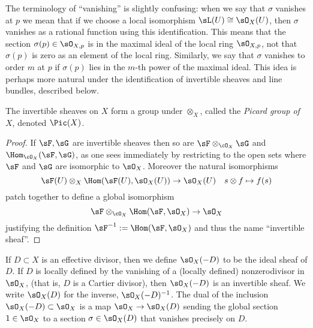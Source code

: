 The terminology of ``vanishing'' is slightly confusing: when we  say that $\sigma$ vanishes at $p$ we mean
that if we choose a local isomorphism $\sL(U) \cong \sO_X(U)$, then $\sigma$ vanishes as a rational function using this
identification. This means that the section $\sigma(p)\in \sO_{X,p}$ is in the maximal ideal of the local ring $ \sO_{X,p}$, not that $\sigma(p)$ is zero
as an element of the local ring. Similarly, we say that $\sigma$ vanishes to order $m$ at $p$ if $\sigma(p)$ lies in the
$m$-th power of the maximal ideal. This idea is perhaps more natural under the identification of invertible sheaves and line bundles, described below.

\begin{proposition}
 The invertible sheaves on $X$ form a group under $\otimes_{X}$, called the 
\emph{Picard group of $X$}, denoted $\Pic(X)$. 
\end{proposition}
\begin{proof}
 If $\sF, \sG$ are invertible sheaves then so are $\sF\otimes_{\cO_X}\sG$ and  $\Hom_{\cO_X}(\sF, \sG)$, as one sees immediately by
restricting to the open sets where $\sF$ and $\sG$ are isomorphic to $\sO_{X}$. Moreover the natural isomorphisms
$$
\sF(U) \otimes_{X} \Hom(\sF(U), \sO_{X}(U)) \to \sO_{X}(U)\quad s \otimes f \mapsto f(s)
$$ 
patch together to define a global isomorphism 
$$
\sF \otimes_{\cO_X} \Hom(\sF, \sO_{X}) \to \sO_{X}
$$
justifying the definition
$\sF^{-1} := \Hom(\sF, \sO_{X})$ and thus the name ``invertible sheaf''. 
\end{proof}
 
If $D\subset X$ is an effective divisor, then we define $\sO_{X}(-D)$ to be the ideal sheaf of $D$. If $D$ is locally defined by the vanishing of a (locally defined) nonzerodivisor in $\sO_{X}$, (that is, $D$ is a Cartier divisor), then
$\sO_{X}(-D)$ is an invertible
sheaf.
We write $\sO_{X}(D)$ for the inverse, $\sO_{X}(-D)^{-1}$. The dual of the inclusion
$\sO_{X}(-D)\subset \sO_{X}$ is a map $\sO_{X} \to \sO_{X}(D)$ sending the global section $1\in \sO_{X}$ to a section
$\sigma\in \sO_{X}(D)$ that vanishes precisely on $D$.

